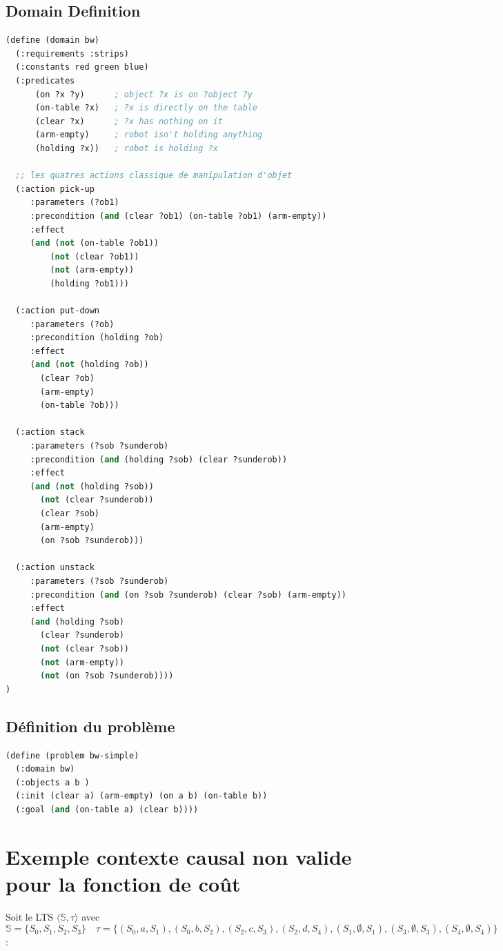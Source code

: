 \documentclass[11pt]{extarticle}
\begin{document}
\subsection*{Domain Definition}
    \begin{lstlisting}[language=Lisp]
(define (domain bw)
  (:requirements :strips)
  (:constants red green blue)
  (:predicates
      (on ?x ?y)      ; object ?x is on ?object ?y
      (on-table ?x)   ; ?x is directly on the table
      (clear ?x)      ; ?x has nothing on it
      (arm-empty)     ; robot isn't holding anything
      (holding ?x))   ; robot is holding ?x

  ;; les quatres actions classique de manipulation d'objet
  (:action pick-up
     :parameters (?ob1)
     :precondition (and (clear ?ob1) (on-table ?ob1) (arm-empty))
     :effect
     (and (not (on-table ?ob1))
  	     (not (clear ?ob1))
	     (not (arm-empty))
	     (holding ?ob1)))

  (:action put-down
     :parameters (?ob)
     :precondition (holding ?ob)
     :effect
     (and (not (holding ?ob))
	   (clear ?ob)
	   (arm-empty)
	   (on-table ?ob)))

  (:action stack
     :parameters (?sob ?sunderob)
     :precondition (and (holding ?sob) (clear ?sunderob))
     :effect
     (and (not (holding ?sob))
	   (not (clear ?sunderob))
	   (clear ?sob)
	   (arm-empty)
	   (on ?sob ?sunderob)))

  (:action unstack
     :parameters (?sob ?sunderob)
     :precondition (and (on ?sob ?sunderob) (clear ?sob) (arm-empty))
     :effect
     (and (holding ?sob)
	   (clear ?sunderob)
	   (not (clear ?sob))
	   (not (arm-empty))
	   (not (on ?sob ?sunderob))))
)
    \end{lstlisting}

\subsection*{Définition du problème}
    \begin{lstlisting}[language=Lisp]
(define (problem bw-simple)
  (:domain bw)
  (:objects a b )
  (:init (clear a) (arm-empty) (on a b) (on-table b))
  (:goal (and (on-table a) (clear b))))
    \end{lstlisting}


\section{Exemple contexte causal non valide pour la fonction de coût}
Soit le LTS $\langle \mathds{S},\tau \rangle$ avec $$\mathds{S} = \{S_0,S_1,S_2,S_3\} \quad \tau = \{(S_0,a,S_1),(S_0,b,S_2),(S_2,c,S_3),(S_2,d,S_4),(S_1,\emptyset,S_1),(S_3,\emptyset,S_3),(S_4,\emptyset,S_4)\}$$:
\end{document}
